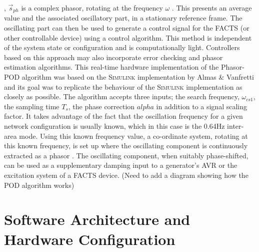 \documentclass[journal]{IEEEtran}
\begin{document}
, $\stackrel{\to }{s}_{ph}$ is a complex phasor, rotating at the frequency $\omega$ \cite{PhasorPOD}. This presents an average value and the associated oscillatory part, in a stationary reference frame. The oscillating part can then be used to generate a control signal for the FACTS (or other controllable device) using a control algorithm. This method is independent of the system state or configuration and is computationally light. Controllers based on this approach may also incorporate error checking and phasor estimation algorithms. This real-time hardware implementation of the Phasor-POD algorithm was based on the \textsc{Simulink} implementation by Almas \& Vanfretti \cite{PhasorPODImplement} and its goal was to replicate the behaviour of the \textsc{Simulink} implementation as closely as possible. The algorithm accepts three inputs; the search frequency, $\omega_{cs1}$, the sampling time $T_{s}$, the phase correction $alpha$ in addition to a signal scaling factor. It takes advantage of the fact that the oscillation frequency for a given network configuration is usually known, which in this case is the 0.64Hz inter-area mode. Using this known frequency value, a  co-ordinate system, rotating at this known frequency, is set up where the oscillating component is continuously extracted as a phasor \cite{PhasorPOD}. The oscillating component, when suitably phase-shifted, can be used as a supplementary damping input to a generator's AVR or the excitation system of a FACTS device. (Need to add a diagram showing how the POD algorithm works)
\section{Software Architecture and Hardware Configuration}\label{softhardware}
\end{document}

